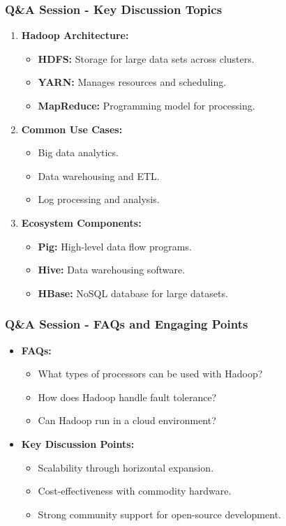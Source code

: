 \documentclass[aspectratio=169]{beamer}
\begin{document}
\begin{frame}[fragile]
    \frametitle{Q\&A Session - Key Discussion Topics}
    \begin{enumerate}
        \item \textbf{Hadoop Architecture:}
            \begin{itemize}
                \item \textbf{HDFS:} Storage for large data sets across clusters.
                \item \textbf{YARN:} Manages resources and scheduling.
                \item \textbf{MapReduce:} Programming model for processing.
            \end{itemize}
        \item \textbf{Common Use Cases:}
            \begin{itemize}
                \item Big data analytics.
                \item Data warehousing and ETL.
                \item Log processing and analysis.
            \end{itemize}
        \item \textbf{Ecosystem Components:}
            \begin{itemize}
                \item \textbf{Pig:} High-level data flow programs.
                \item \textbf{Hive:} Data warehousing software.
                \item \textbf{HBase:} NoSQL database for large datasets.
            \end{itemize}
    \end{enumerate}
\end{frame}

\begin{frame}[fragile]
    \frametitle{Q\&A Session - FAQs and Engaging Points}
    \begin{itemize}
        \item \textbf{FAQs:}
            \begin{itemize}
                \item What types of processors can be used with Hadoop?
                \item How does Hadoop handle fault tolerance?
                \item Can Hadoop run in a cloud environment?
            \end{itemize}
        \item \textbf{Key Discussion Points:}
            \begin{itemize}
                \item Scalability through horizontal expansion.
                \item Cost-effectiveness with commodity hardware.
                \item Strong community support for open-source development.
            \end{itemize}
    \end{itemize}
\end{frame}
\end{document}
